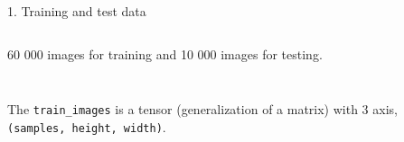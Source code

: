 \documentclass[10pt,ignorenonframetext,]{beamer}
\newenvironment{Shaded}{\begin{snugshade}}{\end{snugshade}}
\newcommand{\CommentTok}[1]{\textcolor[rgb]{0.56,0.35,0.01}{\textit{#1}}}
\newcommand{\NormalTok}[1]{#1}
\newcommand{\OperatorTok}[1]{\textcolor[rgb]{0.81,0.36,0.00}{\textbf{#1}}}
\newcommand{\StringTok}[1]{\textcolor[rgb]{0.31,0.60,0.02}{#1}}
\begin{document}
\begin{frame}[fragile]

\begin{block}{1. Training and test data}

\(~\)

60 000 images for training and 10 000 images for testing.

\(~\)

\scriptsize

\begin{Shaded}
\end{Shaded}

\(~\)

\normalsize

The \texttt{train\_images} is a tensor (generalization of a matrix) with
3 axis, \texttt{(samples,\ height,\ width)}.

\end{block}

\end{frame}
\end{document}
